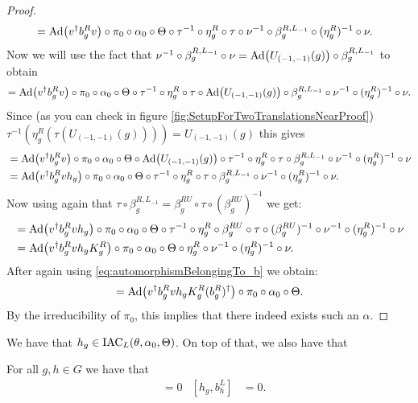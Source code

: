 \documentclass[11pt,a4paper,twoside]{article}
\numberwithin{equation}{section}
\begin{document}
\begin{proof}
\begin{align}
			\nonumber
			&=\Ad{v^\dagger b_g^R v}\circ\pi_0\circ\alpha_0\circ\Theta\circ\tau^{-1}\circ\eta_g^R\circ\tau\circ\nu^{-1}\circ\beta_g^{R,L_{-1}}\circ(\eta_g^R)^{-1}\circ\nu.
		\end{align}
		Now we will use the fact that $\nu^{-1}\circ\beta_g^{R,L_{-1}}\circ\nu=\Ad{U_{(-1,-1)}(g)}\circ\beta_g^{R,L_{-1}}$ to obtain
		\begin{equation}
			=\Ad{v^\dagger b_g^R v}\circ\pi_0\circ\alpha_0\circ\Theta\circ\tau^{-1}\circ\eta_g^R\circ\tau\circ\Ad{U_{(-1,-1)}(g)}\circ\beta_g^{R,L_{-1}}\circ\nu^{-1}\circ(\eta_g^R)^{-1}\circ\nu.
		\end{equation}
		Since (as you can check in figure \ref{fig:SetupForTwoTranslationsNearProof}) $\tau^{-1}(\eta_g^R(\tau(U_{(-1,-1)}(g))))=U_{(-1,-1)}(g)$ this gives
		\begin{align}
			&=\Ad{v^\dagger b_g^R v}\circ\pi_0\circ\alpha_0\circ\Theta\circ\Ad{U_{(-1,-1)}(g)}\circ\tau^{-1}\circ\eta_g^R\circ\tau\circ\beta_g^{R,L_{-1}}\circ\nu^{-1}\circ(\eta_g^R)^{-1}\circ\nu\\
			\nonumber
			&=\Ad{v^\dagger b_g^R vh_g}\circ\pi_0\circ\alpha_0\circ\Theta\circ\tau^{-1}\circ\eta_g^R\circ\tau\circ\beta_g^{R,L_{-1}}\circ\nu^{-1}\circ(\eta_g^R)^{-1}\circ\nu.
		\end{align}
		Now using again that $\tau\circ\beta_g^{R,L_{-1}}=\beta_{g}^{RU}\circ\tau\circ(\beta_g^{RU})^{-1}$ we get:
		\begin{align}
			&=\Ad{v^\dagger b_g^R vh_g}\circ\pi_0\circ\alpha_0\circ\Theta\circ\tau^{-1}\circ\eta_g^R\circ\beta_{g}^{RU}\circ\tau\circ(\beta_g^{RU})^{-1}\circ\nu^{-1}\circ(\eta_g^R)^{-1}\circ\nu\\
			\nonumber
			&=\Ad{v^\dagger b_g^R vh_gK_g^R}\circ\pi_0\circ\alpha_0\circ\Theta\circ\eta_g^R\circ\nu^{-1}\circ(\eta_g^R)^{-1}\circ\nu.
		\end{align}
		After again using \eqref{eq:automorphismBelongingTo_b} we obtain:
		\begin{align}
			=\Ad{v^\dagger b_g^R vh_gK_g^R(b_g^R)^\dagger}\circ\pi_0\circ\alpha_0\circ\Theta.
		\end{align}
		By the irreducibility of $\pi_0$, this implies that there indeed exists such an $\alpha$.
	\end{proof}
	We have that $h_g\in\textrm{IAC}_L(\theta,\alpha_0,\Theta)$. On top of that, we also have that
	\begin{lemma}\label{lem:W_g_And_h_g_Commute}
		For all $g,h\in G$ we have that
		\begin{align}
			[h_g,W_h]&=0&[h_g,b_h^L]&=0.
		\end{align}
	\end{lemma}
\end{document}
